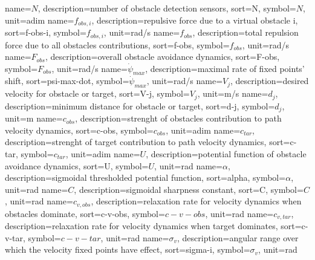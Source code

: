 %
{
  name={\ensuremath{N}},
  description={number of obstacle detection sensors},
  sort=N,
  symbol={\ensuremath{N}},
  unit={adim}
}
%
{
  name={\ensuremath{f_{obs,i}}},
  description={repulsive force due to a virtual obstacle i},
  sort=f-obs-i,
  symbol={\ensuremath{f_{obs,i}}},
  unit={\si{rad/s}}
}
%
{
  name={\ensuremath{f_{obs}}},
  description={total repulsion force due to all obstacles contributions},
  sort=f-obs,
  symbol={\ensuremath{f_{obs}}},
  unit={\si{rad/s}}
}
%
{
  name={\ensuremath{F_{obs}}},
  description={overall obstacle avoidance dynamics},
  sort=F-obs,
  symbol={\ensuremath{F_{obs}}},
  unit={\si{rad/s}}
}
%
{
  name={\ensuremath{\dot \psi_{max}}},
  description={maximal rate of fixed points' shift},
  sort=psi-max-dot,
  symbol={\ensuremath{\dot \psi_{max}}},
  unit={\si{rad/s}}
}
%
{
  name={\ensuremath{V_{j}}},
  description={desired velocity for obstacle or target},
  sort=V-j,
  symbol={\ensuremath{V_{j}}},
  unit={\si{m/s}}
}
%
{
  name={\ensuremath{d_{j}}},
  description={minimum distance for obstacle or target},
  sort=d-j,
  symbol={\ensuremath{d_{j}}},
  unit={\si{m}}
}
%
{
  name={\ensuremath{c_{obs}}},
  description={strenght of obstacles contribution to path velocity dynamics},
  sort=c-obs,
  symbol={\ensuremath{c_{obs}}},
  unit={adim}
}
%
{
  name={\ensuremath{c_{tar}}},
  description={strenght of target contribution to path velocity dynamics},
  sort=c-tar,
  symbol={\ensuremath{c_{tar}}},
  unit={adim}
}
%
{
  name={\ensuremath{U}},
  description={potential function of obstacle avoidance dynamics},
  sort=U,
  symbol={\ensuremath{U}},
  unit={rad}
}
%
{
  name={\ensuremath{\alpha}},
  description={sigmoidal thresholded potential function},
  sort=alpha,
  symbol={\ensuremath{\alpha}},
  unit={rad}
}
%
{
  name={\ensuremath{C}},
  description={sigmoidal sharpness constant},
  sort=C,
  symbol={\ensuremath{C}},
  unit={rad}
}
%
{
  name={\ensuremath{c_{v,obs}}},
  description={relaxation rate for velocity dynamics when obstacles dominate},
  sort=c-v-obs,
  symbol={\ensuremath{c-v-obs}},
  unit={rad}
}
%
{
  name={\ensuremath{c_{v,tar}}},
  description={relaxation rate for velocity dynamics when target dominates},
  sort=c-v-tar,
  symbol={\ensuremath{c-v-tar}},
  unit={rad}
}
{
  name={\ensuremath{\sigma_{v}}},
  description={angular range over which the velocity fixed points have effect},
  sort=sigma-i,
  symbol={\ensuremath{\sigma_{v}}},
  unit={rad}
}
